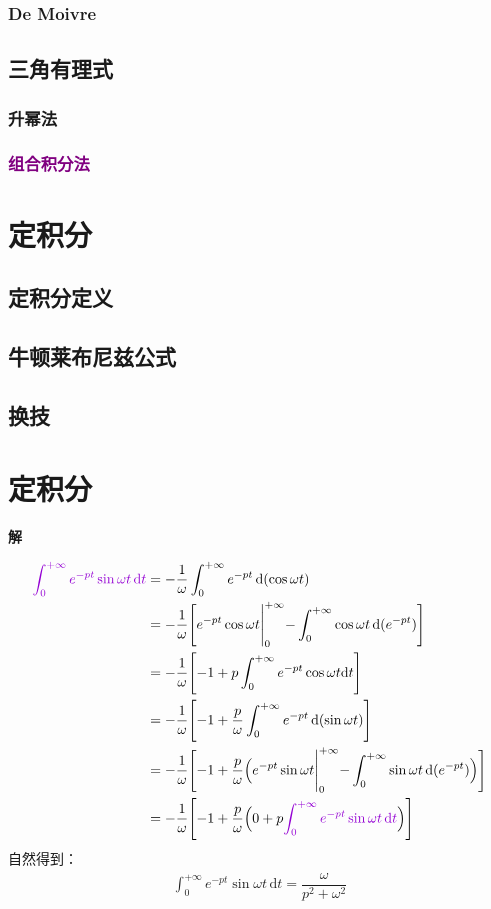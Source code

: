 \documentclass{mycls}
\newcommand{\solutionname}{解}
\newenvironment{solution}{\par\noindent\textbf{\color{red}\solutionname} \kaishu}{\par}
\begin{document}
\subsection{De Moivre}
\section{三角有理式}
\subsection{升幂法}
\subsection{\textcolor{purple}{组合积分法}}
\chapter{定积分}
\section{定积分定义}
\section{牛顿莱布尼兹公式}
\section{换技}
\chapter{定积分}
\begin{solution}
   
\end{solution}
\begin{align*}
   \textcolor{qianzi}{\int_{0}^{+\infty} e^{-pt}\sin {\omega}t\,\mathrm{d}t} &=-\dfrac{1}{\omega}\int_{0}^{+\infty}e^{-pt}\,\mathrm{d}(\cos{\omega t})\\
   &=-\dfrac{1}{\omega}\Biggl[e^{-pt}\cos{\omega t}\Biggl|_{0}^{+\infty}-\int_{0}^{+\infty}\cos{\omega t}\,\mathrm{d}(e^{-pt})\Biggr]\\
   &=-\dfrac{1}{\omega}\Biggl[-1+p\int_{0}^{+\infty }e^{-pt}\cos{\omega t}\mathrm{d}t\Biggr] \\
   &=-\dfrac{1}{\omega}\Biggl[-1+\dfrac{p}{\omega}\int_{0}^{+\infty}e^{-pt}\,\mathrm{d}(\sin{\omega t})\Biggr]\\
   &=-\dfrac{1}{\omega}\Biggl[-1+\dfrac{p}{\omega}\Bigl(e^{-pt}\sin{\omega t}\Biggl|_{0}^{+\infty}-\int_{0}^{+\infty}\sin{\omega t}\,\mathrm{d}(e^{-pt})\Bigr)\Biggr]\\
   &=-\dfrac{1}{\omega}\Biggl[-1+\dfrac{p}{\omega}\Bigl(0+p \textcolor{qianzi}{\int_{0}^{+\infty}e^{-pt}\sin{\omega t}\,\mathrm{d}t}\Bigr)\Biggr]
\end{align*}
自然得到：
\begin{align*}
    \int_{0}^{+\infty}e^{-pt}\sin{\omega t}\,\mathrm{d}t=\dfrac{\omega}{p^{2}+\omega ^{2}}  
\end{align*}
\end{document}
